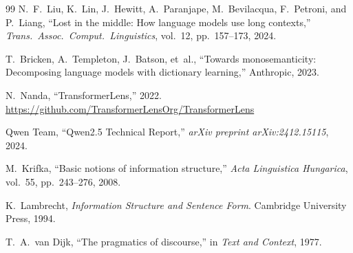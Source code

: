 \documentclass[10pt, letterpaper]{article}
\begin{document}
\begin{thebibliography}{99}
N.~F.~Liu, K.~Lin, J.~Hewitt, A.~Paranjape, M.~Bevilacqua, F.~Petroni, and P.~Liang, ``Lost in the middle: How language models use long contexts,'' \textit{Trans.\ Assoc.\ Comput.\ Linguistics}, vol.~12, pp.~157--173, 2024.

T.~Bricken, A.~Templeton, J.~Batson, et~al., ``Towards monosemanticity: Decomposing language models with dictionary learning,'' Anthropic, 2023.

N.~Nanda, ``TransformerLens,'' 2022. \url{https://github.com/TransformerLensOrg/TransformerLens}

Qwen Team, ``Qwen2.5 Technical Report,'' \textit{arXiv preprint arXiv:2412.15115}, 2024.

M.~Krifka, ``Basic notions of information structure,'' \textit{Acta Linguistica Hungarica}, vol.~55, pp.~243--276, 2008.

K.~Lambrecht, \textit{Information Structure and Sentence Form}. Cambridge University Press, 1994.

T.~A.~van Dijk, ``The pragmatics of discourse,'' in \textit{Text and Context}, 1977.

\end{thebibliography}
\end{document}
